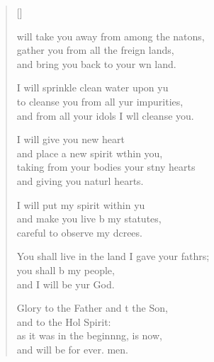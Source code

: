 \settowidth{\versewidth}{You shall live in the land I gave your fathers; +}
\begin{verse}[\versewidth]
  \begin{patverse}
 will take you away from among the nat\pointup{\i}ons,\Flex\\
gather you from all the freign lands,\Med\\
and bring you back to your wn land.

I will sprinkle clean water upon yu\Flex\\
to cleanse you from all yur impurities,\Med\\
and from all your idols I w\pointup{\i}ll cleanse you.

I will give you  new heart\Med\\
and place a new spirit w\pointup{\i}thin you,\\
taking from your bodies your stny hearts\Med\\
and giving you naturl hearts.

I will put my spirit within yu\Flex\\
and make you live b my statutes,\Med\\
careful to observe my dcrees.

You shall live in the land I gave your fathrs;\Flex\\
you shall b my people,\Med\\
and I will be yur God.

Glory to the Father and t the Son,\Med\\
and to the Hol Spirit:\\
as it was in the beginn\pointup{\i}ng, is now,\Med\\
and will be for ever. men.
  \end{patverse}
  \end{verse}
